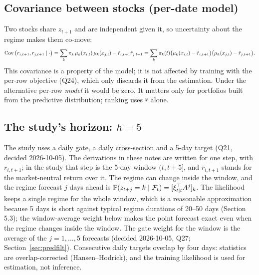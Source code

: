\subsection{Covariance between stocks (per-date model)}
Two stocks share $z_{t+1}$ and are independent given it, so uncertainty about the regime makes them co-move:
\begin{equation}
\operatorname{Cov}\big(r_{i,t+1},r_{j,t+1}\mid\cdot\big)=\sum_k\pi_k\,\mu_k(x_{i,t})\,\mu_k(x_{j,t})-\hat r_{i,t+1}\hat r_{j,t+1}=\sum_k\pi_k(t)\big(\mu_k(x_{i,t})-\hat r_{i,t+1}\big)\big(\mu_k(x_{j,t})-\hat r_{j,t+1}\big).
\end{equation}
This covariance is a property of the model; it is not affected by training with the per-row objective (Q24), which only discards it from the estimation. Under the alternative per-row \emph{model} it would be zero. It matters only for portfolios built from the predictive distribution; ranking uses $\hat r$ alone.

\subsection{The study's horizon: $h=5$}
The study uses a daily gate, a daily cross-section and a 5-day target (Q21, decided 2026-10-05). The derivations in these notes are written for one step, with $r_{i,t+1}$; in the study that step is the 5-day window $(t,t+5]$, and $r_{i,t+1}$ stands for the market-neutral return over it. The regime can change inside the window, and the regime forecast $j$ days ahead is $\mathbb P(z_{t+j}=k\mid\mathcal{F}_t)=[\xi_{t\mid t}^{\top} A^j]_k$. The likelihood keeps a single regime for the whole window, which is a reasonable approximation because 5 days is short against typical regime durations of 20--50 days (Section 5.3); the window-average weight below makes the point forecast exact even when the regime changes inside the window. The gate weight for the window is the average of the $j=1,\dots,5$ forecasts (decided 2026-10-05, Q27; Section~\ref{sec:predfilt}). Consecutive daily targets overlap by four days: statistics are overlap-corrected (Hansen--Hodrick), and the training likelihood is used for estimation, not inference.

